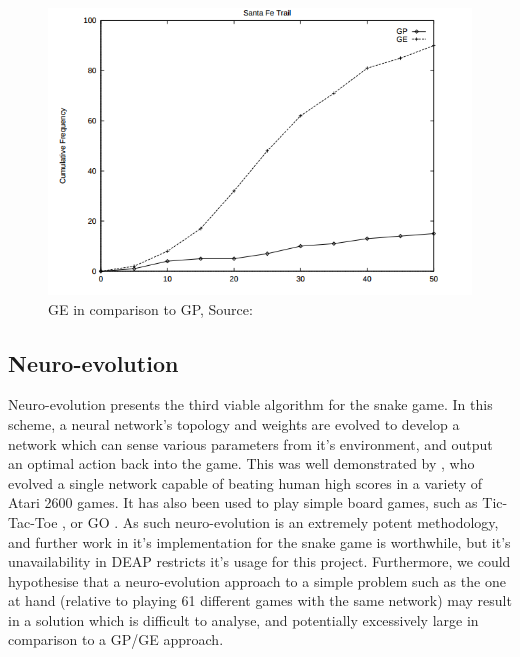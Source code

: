 \documentclass[british,10pt,a4paper]{article}
\begin{document}
\begin{figure}
\centering
	\includegraphics[width=12cm,keepaspectratio]{images/gp_vs_ge.png}
	\caption{GE in comparison to GP, Source: \cite{Michael_ONeill1999-zi}}
	\label{fig:gp_vs_ge}
\end{figure}

\subsection{Neuro-evolution}
Neuro-evolution presents the third viable algorithm for the snake game. In this scheme, a neural network's topology and weights are evolved to develop a network which can sense various parameters from it's environment, and output an optimal action back into the game. This was well demonstrated by \citet{Hausknecht2014-uc}, who evolved a single network capable of beating human high scores in a variety of Atari 2600 games. It has also been used to play simple board games, such as Tic-Tac-Toe \cite{Fogel1993-qp}, or GO \cite{Richards1998-si}. As such neuro-evolution is an extremely potent methodology, and further work in it's implementation for the snake game is worthwhile, but it's unavailability in DEAP restricts it's usage for this project. Furthermore, we could hypothesise that a neuro-evolution approach to a simple problem such as the one at hand (relative to playing 61 different games with the same network) may result in a solution which is difficult to analyse, and potentially excessively large in comparison to a GP/GE approach.
\end{document}
